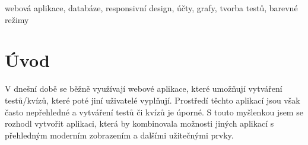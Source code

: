 \documentclass[12pt, a4paper,
openright
]{report}
\begin{document}
	\vspace{18pt}
	
	
	\noindent webová aplikace, databáze, responsivní design, účty, grafy, tvorba testů, barevné režimy
	
	\vspace{18pt}


	
	\clearpage %

	
	\tableofcontents %

	\setcounter{page}{1} %

	\chapter*{Úvod}
	\label{intro}
V dnešní době se běžně využívají webové aplikace, které umožňují vytváření testů/kvízů, které poté jiní uživatelé vyplňují. Prostředí těchto aplikací jsou však často nepřehledné a vytváření testů či kvízů je úporné. S touto myšlenkou jsem se rozhodl vytvořit aplikaci, která by kombinovala možnosti jiných aplikací s přehledným moderním zobrazením a dalšími užitečnými prvky.
\end{document}
